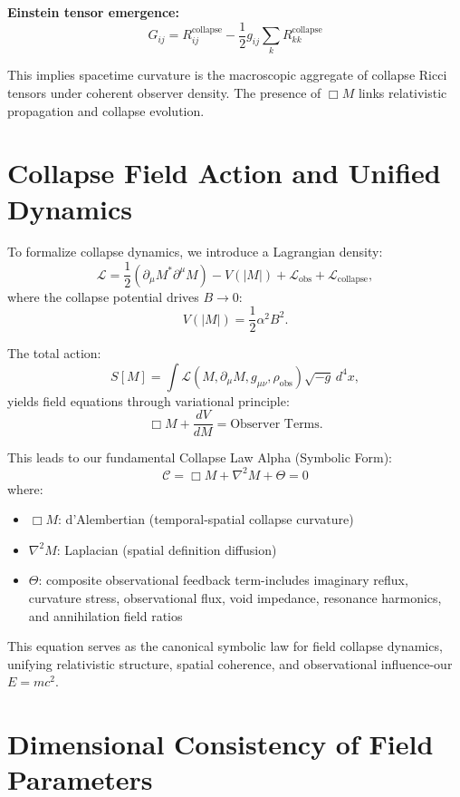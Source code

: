 \textbf{Einstein tensor emergence:}
\begin{equation}
G_{ij} = R_{ij}^{\text{collapse}} - \frac{1}{2} g_{ij} \sum_k R_{kk}^{\text{collapse}}
\end{equation}

This implies spacetime curvature is the macroscopic aggregate of collapse Ricci tensors under coherent observer density. The presence of $\Box M$ links relativistic propagation and collapse evolution.

\section{Collapse Field Action and Unified Dynamics}

To formalize collapse dynamics, we introduce a Lagrangian density:
\[  
\mathcal{L} = \frac{1}{2}(\partial_\mu M^* \partial^\mu M) - V(|M|) + \mathcal{L}_{\text{obs}} + \mathcal{L}_{\text{collapse}},
\]
where the collapse potential drives $B \to 0$:
\[
V(|M|) = \frac{1}{2}\alpha^2 B^2.
\]

The total action:
\[
S[M] = \int \mathcal{L}(M, \partial_\mu M, g_{\mu\nu}, \rho_{\text{obs}}) \sqrt{-g}\, d^4x,
\]
yields field equations through variational principle:
\[
\Box M + \frac{dV}{dM} = \text{Observer Terms}.
\]

This leads to our fundamental Collapse Law Alpha (Symbolic Form):
\begin{equation}
\boxed{\mathcal{C} = \Box M + \nabla^2 M + \Theta = 0}
\end{equation}
where:
\begin{itemize}
  \item $\Box M$: d'Alembertian (temporal-spatial collapse curvature)
  \item $\nabla^2 M$: Laplacian (spatial definition diffusion)
  \item $\Theta$: composite observational feedback term-includes imaginary reflux, curvature stress, observational flux, void impedance, resonance harmonics, and annihilation field ratios
\end{itemize}

This equation serves as the canonical symbolic law for field collapse dynamics, unifying relativistic structure, spatial coherence, and observational influence-our $E=mc^2$.

\section{Dimensional Consistency of Field Parameters}


